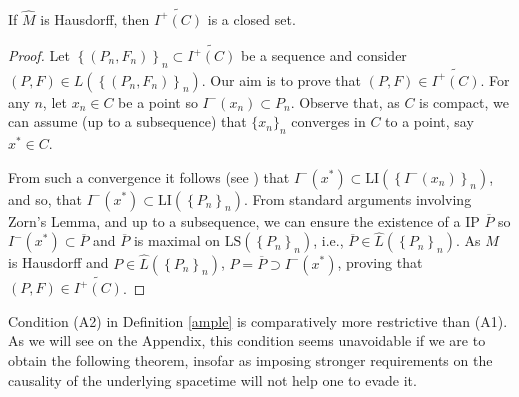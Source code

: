 \begin{proposition}
\label{lema:auxiliar}
If $\hat{M}$ is Hausdorff, then $\widetilde{I^+(C)}$ is a closed set.
\end{proposition}
\begin{proof}
Let $\left\{(P_n,F_n)  \right\}_{n}\subset \widetilde{I^+(C)}$ be a sequence and consider $(P,F)\in L(\left\{ (P_{n},F_n) \right\}_{n})$. Our aim is to prove that $(P,F)\in \widetilde{I^{+}(C)}$. For any $n$, let $x_{n}\in C$ be a point so $I^-(x_n)\subset P_{n}$. Observe that, as $C$ is compact, we can assume (up to a subsequence) that $\{x_{n}\}_{n}$ converges in $C$ to a point, say $x^{*}\in C$.

From such a convergence it follows (see \cite[Remark 3.17]{Floresfinaldefinitioncausal2011}) that $I^{-}(x^{*})\subset \mathrm{LI} (\left\{ I^-(x_{n}) \right\}_{n})$, and so, that $I^{-}(x^{*})\subset \mathrm{LI} (\left\{ P_n\right\}_{n})$. From standard arguments involving Zorn's Lemma, and up to a subsequence, we can ensure the existence of a IP $\overline{P}$ so $I^{-}(x^{*})\subset \overline{P}$ and $\overline{P}$ is maximal on $\mathrm{LS} (\left\{ P_{n} \right\}_{n})$, i.e., $\overline{P}\in \hat{L}(\left\{ P_{n} \right\}_{n})$. As $\hat{M}$ is Hausdorff and $P\in \hat{L}(\left\{ P_n \right\}_{n})$, $P=\overline{P}\supset I^{-}(x^{*})$, proving that $(P,F)\in \widetilde{I^+(C)}$.
\end{proof}

Condition (A2) in Definition \ref{ample} is comparatively more restrictive than (A1). As we will see on the Appendix, this condition seems unavoidable if we are to obtain the following theorem, insofar as imposing stronger requirements on the causality of the underlying spacetime will not help one to evade it.


